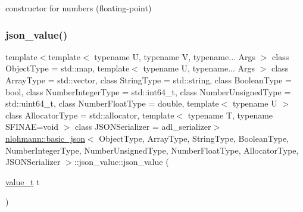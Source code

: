 constructor for numbers (floating-\/point) 

\mbox{\label{unionnlohmann_1_1basic__json_1_1json__value_a34114e47b2d6391ba97678cefef700c4}} 
\subsubsection{\texorpdfstring{json\_value()}{json\_value()}\hspace{0.1cm}{\footnotesize\ttfamily [6/12]}}
{\footnotesize\ttfamily template$<$template$<$ typename U, typename V, typename... Args $>$ class Object\+Type = std\+::map, template$<$ typename U, typename... Args $>$ class Array\+Type = std\+::vector, class String\+Type  = std\+::string, class Boolean\+Type  = bool, class Number\+Integer\+Type  = std\+::int64\+\_\+t, class Number\+Unsigned\+Type  = std\+::uint64\+\_\+t, class Number\+Float\+Type  = double, template$<$ typename U $>$ class Allocator\+Type = std\+::allocator, template$<$ typename T, typename S\+F\+I\+N\+A\+E=void $>$ class J\+S\+O\+N\+Serializer = adl\+\_\+serializer$>$ \\
\mbox{\hyperlink{classnlohmann_1_1basic__json}{nlohmann\+::basic\+\_\+json}}$<$ Object\+Type, Array\+Type, String\+Type, Boolean\+Type, Number\+Integer\+Type, Number\+Unsigned\+Type, Number\+Float\+Type, Allocator\+Type, J\+S\+O\+N\+Serializer $>$\+::json\+\_\+value\+::json\+\_\+value (\begin{DoxyParamCaption}\item[{\mbox{\hyperlink{namespacenlohmann_1_1detail_a1ed8fc6239da25abcaf681d30ace4985}{value\+\_\+t}}}]{t }\end{DoxyParamCaption})\hspace{0.3cm}{\ttfamily [inline]}}



